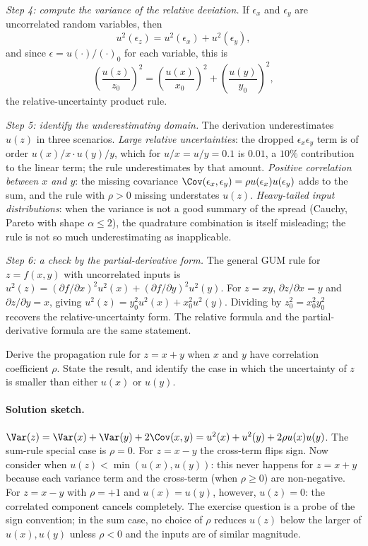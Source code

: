 \emph{Step 4: compute the variance of the relative deviation.} If
$\epsilon_{x}$ and $\epsilon_{y}$ are uncorrelated random
variables, then
\[
u^{2}(\epsilon_{z}) = u^{2}(\epsilon_{x}) + u^{2}(\epsilon_{y}),
\]
and since $\epsilon = u(\cdot)/(\cdot)_{0}$ for each variable,
this is
\[
\left(\frac{u(z)}{z_{0}}\right)^{2} = \left(\frac{u(x)}{x_{0}}
\right)^{2} + \left(\frac{u(y)}{y_{0}}\right)^{2},
\]
the relative-uncertainty product rule.

\emph{Step 5: identify the underestimating domain.} The derivation
underestimates $u(z)$ in three scenarios. \emph{Large relative
uncertainties}: the dropped $\epsilon_{x}\epsilon_{y}$ term is of
order $u(x)/x \cdot u(y)/y$, which for $u/x = u/y = 0.1$ is
$0.01$, a $10\%$ contribution to the linear term; the rule
underestimates by that amount. \emph{Positive correlation between
$x$ and $y$}: the missing covariance $\Cov(\epsilon_{x},
\epsilon_{y}) = \rho u(\epsilon_{x}) u(\epsilon_{y})$ adds to the
sum, and the rule with $\rho > 0$ missing understates $u(z)$.
\emph{Heavy-tailed input distributions}: when the variance is not
a good summary of the spread (Cauchy, Pareto with shape
$\alpha \leq 2$), the quadrature combination is itself
misleading; the rule is not so much underestimating as inapplicable.

\emph{Step 6: a check by the partial-derivative form.} The general
GUM rule for $z = f(x, y)$ with uncorrelated inputs is $u^{2}(z) =
(\partial f/\partial x)^{2} u^{2}(x) + (\partial f/\partial y)^{2}
u^{2}(y)$. For $z = xy$, $\partial z/\partial x = y$ and
$\partial z/\partial y = x$, giving $u^{2}(z) = y_{0}^{2} u^{2}(x)
+ x_{0}^{2} u^{2}(y)$. Dividing by $z_{0}^{2} = x_{0}^{2} y_{0}^{2}$
recovers the relative-uncertainty form. The relative formula and
the partial-derivative formula are the same statement.

\begin{exercise}
Derive the propagation rule for $z = x + y$ when $x$ and $y$ have
correlation coefficient $\rho$. State the result, and identify the
case in which the uncertainty of $z$ is smaller than either $u(x)$
or $u(y)$.
\end{exercise}

\paragraph{Solution sketch.}
$\Var(z) = \Var(x) + \Var(y) + 2 \Cov(x, y) = u^{2}(x) + u^{2}(y)
+ 2 \rho u(x) u(y)$. The sum-rule special case is
$\rho = 0$. For $z = x - y$ the cross-term flips sign. Now consider
when $u(z) < \min(u(x), u(y))$: this never happens for $z = x + y$
because each variance term and the cross-term (when $\rho \geq 0$)
are non-negative. For $z = x - y$ with $\rho = +1$ and
$u(x) = u(y)$, however, $u(z) = 0$: the correlated component
cancels completely. The exercise question is a probe of the sign
convention; in the sum case, no choice of $\rho$ reduces $u(z)$
below the larger of $u(x), u(y)$ unless $\rho < 0$ and the inputs
are of similar magnitude.


